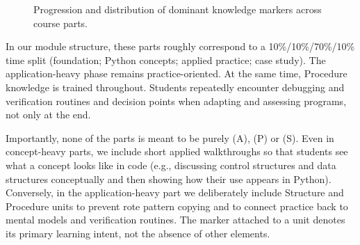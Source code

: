 \documentclass{article}
\begin{document}
\begin{figure}[hbt!]
  \centering
  \caption{Progression and distribution of dominant knowledge markers across course parts.}
  \label{fig:coursestructure}
  \end{figure}

In our module structure, these parts roughly correspond to a 10\%/10\%/70\%/10\% time split (foundation; Python concepts; applied practice; case study). The application-heavy phase remains practice-oriented. At the same time, Procedure knowledge is trained throughout. Students repeatedly encounter debugging and verification routines and decision points when adapting and assessing programs, not only at the end.\par
Importantly, none of the parts is meant to be purely (A), (P) or (S). Even in concept-heavy parts, we include short applied walkthroughs so that students see what a concept looks like in code (e.g., discussing control structures and data structures conceptually and then showing how their use appears in Python). Conversely, in the application-heavy part we deliberately include Structure and Procedure units to prevent rote pattern copying and to connect practice back to mental models and verification routines. The marker attached to a unit denotes its primary learning intent, not the absence of other elements.
\end{document}
